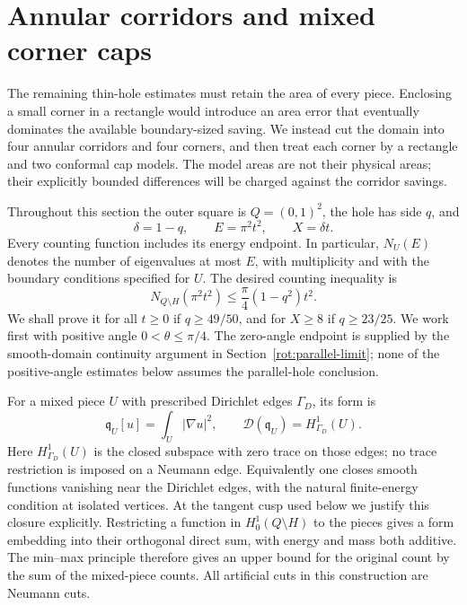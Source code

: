 \documentclass[11pt,reqno]{amsart}
\numberwithin{equation}{section}
\begin{document}

\section{Annular corridors and mixed corner caps}
\label{geo:section}

The remaining thin-hole estimates must retain the area of every piece.
Enclosing a small corner in a rectangle would introduce an area error
that eventually dominates the available boundary-sized saving.  We
instead cut the domain into four annular corridors and four corners,
and then treat each corner by a rectangle and two conformal cap models.
The model areas are not their physical areas; their explicitly bounded
differences will be charged against the corridor savings.

Throughout this section the outer square is $Q=(0,1)^2$, the hole has
side $q$, and
\[
 \delta=1-q,\qquad E=\pi^2t^2,\qquad X=\delta t.
\]
Every counting function includes its energy endpoint.  In particular,
$N_U(E)$ denotes the number of eigenvalues at most $E$, with
multiplicity and with the boundary conditions specified for $U$.
The desired counting inequality is
\begin{equation}\label{geo:target}
 N_{Q\setminus H}(\pi^2t^2)\le\frac{\pi}{4}(1-q^2)t^2.
\end{equation}
We shall prove it for all $t\ge0$ if $q\ge49/50$, and for
$X\ge8$ if $q\ge23/25$.  We work first with positive angle
$0<\theta\le\pi/4$.  The zero-angle endpoint is supplied by the
smooth-domain continuity argument in Section~\ref{rot:parallel-limit};
none of the positive-angle estimates below assumes the parallel-hole
conclusion.

For a mixed piece $U$ with prescribed Dirichlet edges $\Gamma_D$, its
form is
\[
 \mathfrak q_U[u]=\int_U|\nabla u|^2,
 \qquad
 \mathcal D(\mathfrak q_U)=H^1_{\Gamma_D}(U).
\]
Here $H^1_{\Gamma_D}(U)$ is the closed subspace with zero trace on those
edges; no trace restriction is imposed on a Neumann edge.  Equivalently
one closes smooth functions vanishing near the Dirichlet edges, with
the natural finite-energy condition at isolated vertices.  At the
tangent cusp used below we justify this closure explicitly.  Restricting
a function in $H^1_0(Q\setminus H)$ to the pieces gives a form embedding
into their orthogonal direct sum, with energy and mass both additive.
The min--max principle therefore gives an upper bound for the original
count by the sum of the mixed-piece counts.  All artificial cuts in
this construction are Neumann cuts.
\end{document}
